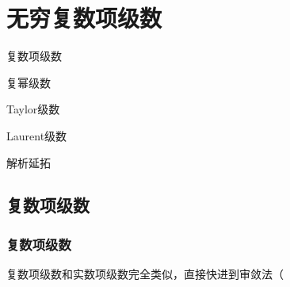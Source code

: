 \chapter{无穷复数项级数}
\begin{introduction}
    \item 复数项级数
    \item 复幂级数
    \item Taylor级数
    \item Laurent级数
    \item 解析延拓
\end{introduction}

\section{复数项级数}
    \subsection{复数项级数}
    复数项级数和实数项级数完全类似，直接快进到审敛法（

